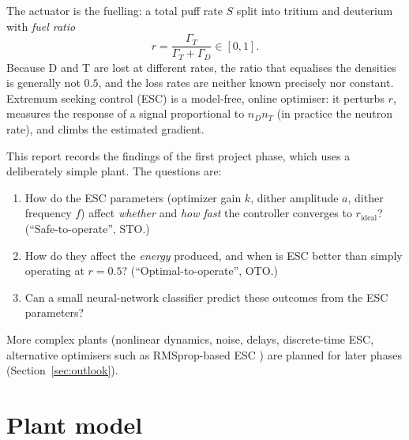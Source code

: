 \documentclass[11pt,a4paper]{article}
\newcommand{\nD}{n_D}
\newcommand{\nT}{n_T}
\newcommand{\rid}{r_\mathrm{ideal}}
\begin{document}
The actuator is the fuelling: a total puff rate $S$ split into tritium and deuterium with \emph{fuel ratio}
\begin{equation}
  r = \frac{\Gamma_T}{\Gamma_T+\Gamma_D}\in[0,1].
\end{equation}
Because D and T are lost at different rates, the ratio that equalises the densities is generally not $0.5$, and the loss rates are neither known precisely nor constant.
Extremum seeking control (ESC) \citep{krstic2000stability,ariyur2003realtime,tan2010extremum} is a model-free, online optimiser: it perturbs $r$, measures the response of a signal proportional to $\nD\nT$ (in practice the neutron rate), and climbs the estimated gradient.

This report records the findings of the first project phase, which uses a deliberately simple plant. The questions are:
\begin{enumerate}
  \item How do the ESC parameters (optimizer gain $k$, dither amplitude $a$, dither frequency $f$) affect \emph{whether} and \emph{how fast} the controller converges to $\rid$? (``Safe-to-operate'', STO.)
  \item How do they affect the \emph{energy} produced, and when is ESC better than simply operating at $r=0.5$? (``Optimal-to-operate'', OTO.)
  \item Can a small neural-network classifier predict these outcomes from the ESC parameters?
\end{enumerate}
More complex plants (nonlinear dynamics, noise, delays, discrete-time ESC, alternative optimisers such as RMSprop-based ESC \citep{mcnamee_rmsprop_esc}) are planned for later phases (Section~\ref{sec:outlook}).

\section{Plant model}
\label{sec:model}
\end{document}
